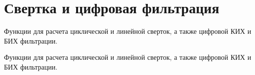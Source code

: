 \hypertarget{group___c_o_n_v___g_r_o_u_p}{}\section{Свертка и цифровая фильтрация}
\label{group___c_o_n_v___g_r_o_u_p}


Функции для расчета циклической и линейной сверток, а также цифровой КИХ и БИХ фильтрации.  


Функции для расчета циклической и линейной сверток, а также цифровой КИХ и БИХ фильтрации. 

